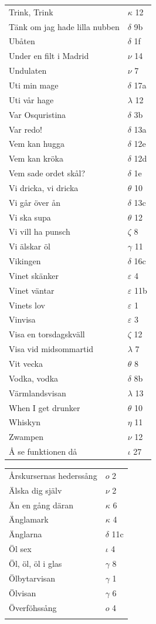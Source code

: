 \documentclass[a6paper,10pt]{article}
\begin{document}
\newpage
\begin{table}[!h]
\begin{tabular}{l l}
Trink, Trink&	$\kappa$ 12\\
Tänk om jag hade lilla nubben&	$\delta$ 9b\\
Ubåten	&$\delta$ 1f\\
Under en filt i Madrid	&$\nu$ 14\\
Undulaten&	$\nu$ 7\\
Uti min mage	&$\delta$ 17a\\
Uti vår hage	&$\lambda$ 12\\
Var Osquristina	&$\delta$ 3b\\
Var redo!	&$\delta$ 13a\\
Vem kan hugga	&$\delta$ 12e\\
Vem kan kröka	&$\delta$ 12d\\
Vem sade ordet skål?	&$\delta$ 1e\\
Vi dricka, vi dricka&	$\theta$ 10\\
Vi går över ån	&$\delta$ 13c\\
Vi ska supa	&$\theta$ 12\\
Vi vill ha punsch	&$\zeta$ 8\\
Vi älskar öl	&$\gamma$ 11\\
Vikingen	&$\delta$ 16c\\
Vinet skänker	&$\varepsilon$ 4\\
Vinet väntar	&$\varepsilon$ 11b\\
Vinets lov	&$\varepsilon$ 1\\
Vinvisa	&$\varepsilon$ 3\\
Visa en torsdagskväll	&$\zeta$ 12\\
Visa vid midsommartid &$\lambda$ 7\\
Vit vecka	&$\theta$ 8\\
Vodka, vodka	&$\delta$ 8b\\
Värmlandsvisan	&$\lambda$ 13\\
When I get drunker	&$\theta$ 10\\
Whiskyn	&$\eta$ 11\\
Zwampen&	$\nu$ 12\\
Å se funktionen då&$\iota$ 27\\
\end{tabular}
\end{table}
\newpage
\begin{table}[!h]
\begin{tabular}{l l}
Årskursernas hederssång&$o$ 2\\
Älska dig själv&$\nu$ 2\\
Än en gång däran&$\kappa$ 6\\
Änglamark&$\kappa$ 4\\
Änglarna&$\delta$ 11c\\
Öl sex&	$\iota$ 4\\
Öl, öl, öl i glas	&$\gamma$ 8\\
Ölbytarvisan	&$\gamma$ 1\\
Ölvisan&$\gamma$ 6\\
Överföhssång&	$o$ 4\\
\vspace{180pt}
\end{tabular}
\end{table}
\end{document}
